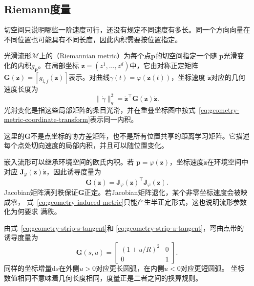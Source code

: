 \subsection{Riemann度量}

切空间只说明哪些一阶速度可行，还没有规定不同速度有多长。同一个方向向量在不同位置也可能具有不同长度，因此内积需要按位置指定。

\begin{definition}[Riemann度量]
\label{def:geometry-riemannian-metric}
光滑流形$\mathcal M$上的（Riemannian metric）为每个点$\bm{p}$的切空间指定一个随
$\bm{p}$光滑变化的内积$g_{\bm{p}}$。在局部坐标
$\bm{z}=(z^1,\ldots,z^d)$中，它由对称正定矩阵
$\bm{G}(\bm{z})=[g_{i,j}(\bm{z})]$表示。对曲线$\gamma(t)=\varphi(\bm z(t))$，坐标速度
$\dot{\bm{z}}$对应的几何速度长度为
\begin{equation}
  \lVert\dot{\gamma}\rVert_g^2
  =
  \dot{\bm{z}}^{\top}
  \bm{G}(\bm{z})
  \dot{\bm{z}}.
  \label{eq:geometry-riemannian-speed}
\end{equation}
光滑变化是指这些局部矩阵的条目光滑，并在重叠坐标图中按式~\eqref{eq:geometry-metric-coordinate-transform}表示同一内积。
\end{definition}
这里的$\bm{G}$不是点坐标的协方差矩阵，也不是所有位置共享的距离学习矩阵。它描述
每个点处切向速度的局部内积，并且可以随位置变化。

嵌入流形可以继承环境空间的欧氏内积。若
$\bm{p}=\varphi(\bm{z})$，坐标速度$\dot{\bm{z}}$在环境空间中对应
$\bm{J}_{\varphi}(\bm{z})\dot{\bm{z}}$，因此诱导度量为
\begin{equation}
  \bm{G}(\bm{z})
  =
  \bm{J}_{\varphi}(\bm{z})^{\top}
  \bm{J}_{\varphi}(\bm{z}).
  \label{eq:geometry-induced-metric}
\end{equation}
Jacobian矩阵满列秩保证$\bm{G}$正定。若Jacobian矩阵退化，某个非零坐标速度会被映成零，
式~\eqref{eq:geometry-induced-metric}只能产生半正定形式，这也说明流形参数化为何要求
满秩。

由式~\eqref{eq:geometry-strip-s-tangent}和
\eqref{eq:geometry-strip-u-tangent}，弯曲点带的诱导度量为
\begin{equation}
  \bm{G}(s,u)
  =
  \begin{bmatrix}
    (1+u/R)^2 & 0\\
    0 & 1
  \end{bmatrix}.
  \label{eq:geometry-strip-metric}
\end{equation}
同样的坐标增量$\mathrm{d}s$在外侧$u>0$对应更长圆弧，在内侧$u<0$对应更短圆弧。
坐标数值相同不意味着几何长度相同，度量正是二者之间的换算规则。

